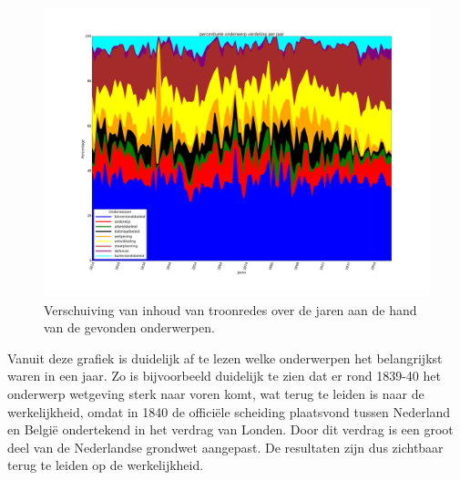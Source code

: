 \begin{figure}[H]
\hfill\includegraphics[width=1.2\textwidth,left]{fig/onderwerpverdeling2}
\caption{\label{onderwerpverdeling} Verschuiving van inhoud van troonredes over de jaren aan de hand van de gevonden onderwerpen.}
\end{figure}

Vanuit deze grafiek is duidelijk af te lezen welke onderwerpen het belangrijkst waren in een jaar. Zo is bijvoorbeeld duidelijk te zien dat er rond 1839-40 het onderwerp wetgeving sterk naar voren komt, wat terug te leiden is naar de werkelijkheid, omdat in 1840 de officiële scheiding plaatsvond tussen Nederland en België ondertekend in het verdrag van Londen. Door dit verdrag is een groot deel van de Nederlandse grondwet aangepast. \citep{schroeder1996transformation} De resultaten zijn dus zichtbaar terug te leiden op de werkelijkheid.